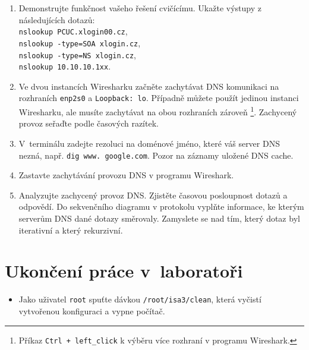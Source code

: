 \documentclass[a4paper,11pt]{article}
\begin{document}
\begin{enumerate}
    {\tt dig PCUC.xlogin00.cz},\\
    {\tt dig -x 10.10.10.1xx}, kde {\tt xx} je číslo vašeho počítače.
  \item Demonstrujte funkčnost vašeho řešení cvičícímu. Ukažte výstupy z následujících dotazů: \\
    {\tt nslookup PCUC.xlogin00.cz}, \\
    {\tt nslookup -type=SOA xlogin.cz}, \\
    {\tt nslookup -type=NS xlogin.cz}, \\
    {\tt nslookup 10.10.10.1xx}. 
  \item Ve dvou instancích Wiresharku začněte zachytávat DNS komunikaci na rozhraních {\tt enp2s0} a {\tt Loopback: lo}. Případně můžete použít jedinou instanci Wiresharku, ale musíte zachytávat na obou rozhraních zároveň \footnote{Příkaz \texttt{Ctrl + left\_click} k výběru více rozhraní v programu Wireshark.}. Zachycený provoz seřaďte podle časových razítek.
  
  \item V~terminálu zadejte rezoluci na doménové jméno, které váš server DNS nezná, např. {\tt dig www. google.com}. Pozor na záznamy uložené DNS cache.
  
  \item Zastavte zachytávání provozu DNS v programu Wireshark.
  \item Analyzujte zachycený provoz DNS. Zjistěte časovou posloupnost dotazů a odpovědí. Do sekvenčního diagramu v  protokolu vyplňte informace, ke kterým serverům DNS dané dotazy směrovaly. Zamyslete se nad tím, který dotaz byl iterativní a který rekurzivní. 
\end{enumerate}

\section{Ukončení práce v~laboratoři}
\begin{itemize}
  \item Jako uživatel {\tt root} spuťte dávkou {\tt /root/isa3/clean}, která vyčistí vytvořenou konfiguraci a vypne počítač.
\end{itemize}
\end{document}
